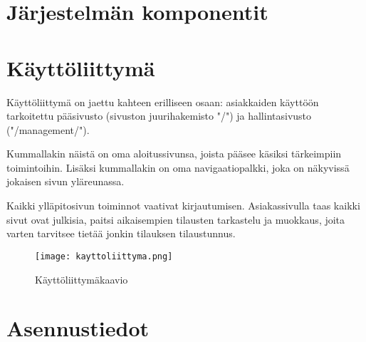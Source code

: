 \documentclass[a4paper, 12pt, finnish]{article}
\begin{document}
\section{Järjestelmän komponentit}

\section{Käyttöliittymä}

Käyttöliittymä on jaettu kahteen erilliseen osaan: asiakkaiden käyttöön tarkoitettu pääsivusto (sivuston juurihakemisto "/") ja hallintasivusto ("/management/").

Kummallakin näistä on oma aloitussivunsa, joista pääsee käsiksi tärkeimpiin toimintoihin. Lisäksi kummallakin on oma navigaatiopalkki, joka on näkyvissä jokaisen sivun yläreunassa.

Kaikki ylläpitosivun toiminnot vaativat kirjautumisen. Asiakassivulla taas kaikki sivut ovat julkisia, paitsi aikaisempien tilausten tarkastelu ja muokkaus, joita varten tarvitsee tietää jonkin tilauksen tilaustunnus.

\begin{figure}[H]
	\begin{center}
	\caption{Käyttöliittymäkaavio}
	\texttt{[image: kayttoliittyma.png]}
	\end{center}
\end{figure}

\section{Asennustiedot}
\end{document}
